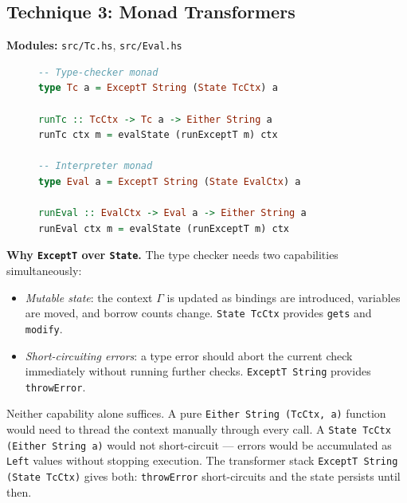 \subsection{Technique 3: Monad Transformers}

\textbf{Modules:} \texttt{src/Tc.hs}, \texttt{src/Eval.hs}

\begin{figure}[ht!]
    \centering
    \begin{minipage}{.9\linewidth}
\begin{lstlisting}[language=Haskell]
-- Type-checker monad
type Tc a = ExceptT String (State TcCtx) a

runTc :: TcCtx -> Tc a -> Either String a
runTc ctx m = evalState (runExceptT m) ctx

-- Interpreter monad
type Eval a = ExceptT String (State EvalCtx) a

runEval :: EvalCtx -> Eval a -> Either String a
runEval ctx m = evalState (runExceptT m) ctx
\end{lstlisting}
    \end{minipage}
    \label{lst:monads}
\end{figure}

\noindent
\textbf{Why \texttt{ExceptT} over \texttt{State}.}
The type checker needs two capabilities simultaneously:
\begin{itemize}
  \item \emph{Mutable state}: the context $\Gamma$ is updated as bindings are
    introduced, variables are moved, and borrow counts change.
    \texttt{State TcCtx} provides \texttt{gets} and \texttt{modify}.
  \item \emph{Short-circuiting errors}: a type error should abort the current
    check immediately without running further checks.
    \texttt{ExceptT String} provides \texttt{throwError}.
\end{itemize}

Neither capability alone suffices.
A pure \texttt{Either String (TcCtx, a)} function would need to thread the
context manually through every call.
A \texttt{State TcCtx (Either String a)} would not short-circuit --- errors
would be accumulated as \texttt{Left} values without stopping execution.
The transformer stack \texttt{ExceptT String (State TcCtx)} gives both:
\texttt{throwError} short-circuits and the state persists until then.

